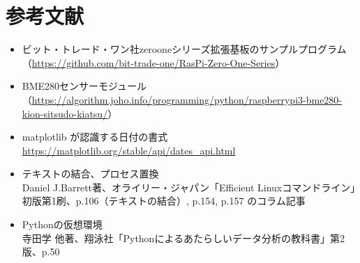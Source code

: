 \documentclass[12pt,a4paper,uplatex]{jsarticle}
\begin{document}

\section{参考文献}

\begin{itemize}
	\item ビット・トレード・ワン社zerooneシリーズ拡張基板のサンプルプログラム\\
	（\url{https://github.com/bit-trade-one/RasPi-Zero-One-Series}）
	\item BME280センサーモジュール\\
	（\url{https://algorithm.joho.info/programming/python/raspberrypi3-bme280-kion-sitsudo-kiatsu/}）
	\item matplotlib が認識する日付の書式\\
	\url{https://matplotlib.org/stable/api/dates_api.html}
	\item テキストの結合、プロセス置換\\
	Daniel J.Barrett著、オライリー・ジャパン「Efficient Linuxコマンドライン」初版第1刷、p.106（テキストの結合）, p.154, p.157 のコラム記事
	\item Pythonの仮想環境\\
	寺田学 他著、翔泳社「Pythonによるあたらしいデータ分析の教科書」第2版、p.50
\end{itemize}
\end{document}
